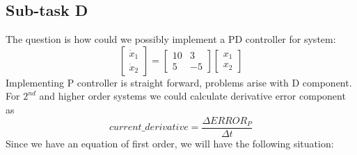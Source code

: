 \documentclass[12pt,letterpaper]{article}
\begin{document}
\subsection*{Sub-task D}
    The question is how could we possibly implement a PD controller for system:
    \begin{equation*}
        \begin{bmatrix} 
            \dot x_1 \\ \dot x_2 \end{bmatrix} = 
        \begin{bmatrix} 
            10 & 3 \\
            5 & -5 
        \end{bmatrix} 
            \begin{bmatrix}x_1 \\ x_2 \end{bmatrix}
    \end{equation*}
    Implementing P controller is straight forward, problems arise with D component.\\
    For $2^{nd}$ and higher order systems we could calculate derivative error component as 
    \begin{equation*}
        current\_derivative = \frac{\Delta ERROR_P}{\Delta t}
    \end{equation*}
    Since we have an equation of first order, we will have the following situation:
    
\end{document}
